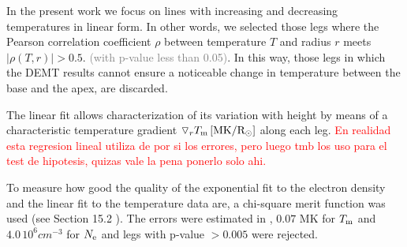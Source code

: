 \documentclass[namedreferences]{solarphysics}
\newcommand{\mrsun}{{\rm R_\odot}}
\newcommand{\MK}{{\rm MK}}
\newcommand{\dr}{\triangledown_r}
\newcommand{\Tm}{T_{\rm m}}
\newcommand{\Ne}{N_{\rm e}}
\newcommand{\rhoTr}{\rho(T,r)}
\def\diego#1{\textcolor{red}{#1}}
\def\temp#1{\textcolor{gray}{#1}}
\begin{document}
\begin{article}


In the present work we focus on lines with increasing and decreasing temperatures in linear form. In other words, we selected those legs where the {Pearson correlation coefficient $\rho$ between temperature $T$ and radius $r$ meets $|\rhoTr| > 0.5$}. \temp{(with p-value less than 0.05)}. In this way, those legs in which the DEMT results cannot ensure a noticeable change in temperature between the base and the apex, are discarded.


The linear fit allows characterization of its variation with height by means of a characteristic temperature gradient $\dr \Tm\,[\MK/\mrsun]$ along each leg.
\diego{En realidad esta regresion lineal utiliza de por si los errores, pero luego tmb los uso para el test de hipotesis, quizas vale la pena ponerlo solo ahi.}


To measure how good the quality of the exponential fit to the electron density and the linear fit to the temperature data are, a chi-square merit function was used (see Section 15.2 \citet{recipes}). The errors were estimated in \citet{lloveras_2017}, $0.07$ MK for $\Tm$ and $4.0\,10^6 cm^{-3}$ for $\Ne$ and legs with p-value $>0.005$ were rejected. 




\end{article}
\end{document}

